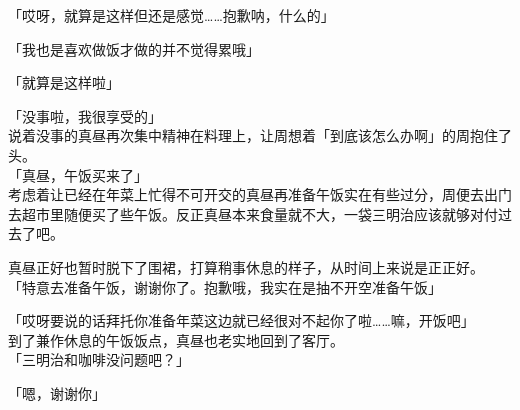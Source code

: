 「哎呀，就算是这样但还是感觉……抱歉呐，什么的」

「我也是喜欢做饭才做的并不觉得累哦」

「就算是这样啦」

「没事啦，我很享受的」\\

说着没事的真昼再次集中精神在料理上，让周想着「到底该怎么办啊」的周抱住了头。\\



「真昼，午饭买来了」\\

考虑着让已经在年菜上忙得不可开交的真昼再准备午饭实在有些过分，周便去出门去超市里随便买了些午饭。反正真昼本来食量就不大，一袋三明治应该就够对付过去了吧。

真昼正好也暂时脱下了围裙，打算稍事休息的样子，从时间上来说是正正好。\\

「特意去准备午饭，谢谢你了。抱歉哦，我实在是抽不开空准备午饭」

「哎呀要说的话拜托你准备年菜这边就已经很对不起你了啦……嘛，开饭吧」\\

到了兼作休息的午饭饭点，真昼也老实地回到了客厅。\\

「三明治和咖啡没问题吧？」

「嗯，谢谢你」\\

